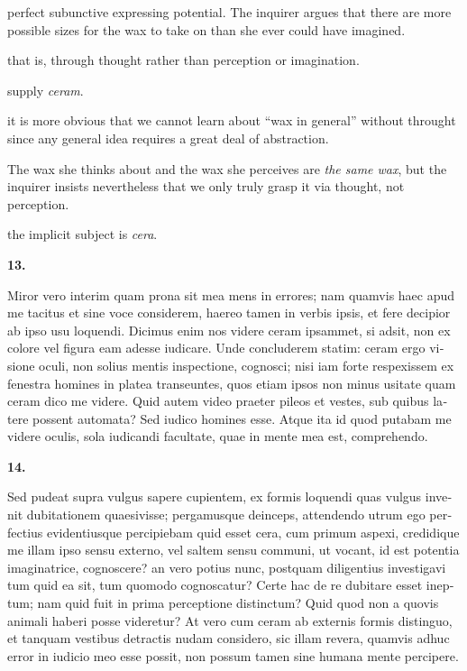  perfect subunctive expressing potential. The inquirer argues that there are more possible sizes for the wax to take on than she ever could have imagined.

 that is, through thought rather than perception or imagination.

 supply \textit{ceram}.

 it is more obvious that we cannot learn about ``wax in general'' without throught since any general idea requires a great deal of abstraction.

 The wax she thinks about and the wax she perceives are \textit{the same wax}, but the inquirer insists nevertheless that we only truly grasp it via thought, not perception.

 the implicit subject is \textit{cera}.

\clearpage

\beginnumbering
\pstart
    \textbf{13.} \begin{latin}Miror vero interim quam prona sit mea mens in errores; nam quamvis haec apud me tacitus et sine voce considerem, haereo tamen in verbis ipsis, et fere decipior ab ipso usu loquendi. Dicimus enim nos videre ceram ipsammet, si adsit, non ex colore vel figura eam adesse iudicare. Unde concluderem statim: ceram ergo visione oculi, non solius mentis inspectione, cognosci; nisi iam forte respexissem ex fenestra homines in platea transeuntes, quos etiam ipsos non minus usitate quam ceram dico me videre. Quid autem video praeter pileos et vestes, sub quibus latere possent automata? Sed iudico homines esse. Atque ita id quod putabam me videre oculis, sola iudicandi facultate, quae in mente mea est, comprehendo.\end{latin}
\pend
\endnumbering
\beginnumbering
\pstart
    \textbf{14.} \begin{latin}Sed pudeat supra vulgus sapere cupientem, ex formis loquendi quas vulgus invenit dubitationem quaesivisse; pergamusque deinceps, attendendo utrum ego perfectius evidentiusque percipiebam quid esset cera, cum primum aspexi, credidique me illam ipso sensu externo, vel saltem sensu communi, ut vocant, id est potentia imaginatrice, cognoscere? an vero potius nunc, postquam diligentius investigavi tum quid ea sit, tum quomodo cognoscatur? Certe hac de re dubitare esset ineptum; nam quid fuit in prima perceptione distinctum? Quid quod non a quovis animali haberi posse videretur? At vero cum ceram ab externis formis distinguo, et tanquam vestibus detractis nudam considero, sic illam revera, quamvis adhuc error in iudicio meo esse possit, non possum tamen sine humana mente percipere.\end{latin}
\pend
\endnumbering

